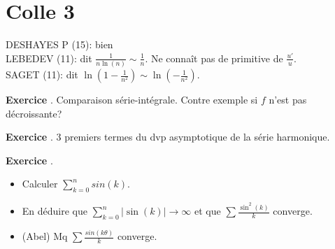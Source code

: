 \documentclass[10pt,a4paper]{article}
\newcounter{question}
\newcounter{exo}
\newenvironment{exo}{\vspace{0.5cm}\setcounter{question}{0}\addtocounter{exo}{1} \noindent \textbf{Exercice \theexo}. \normalsize }{\par}
\begin{document}
	\section*{Colle 3}
	\setcounter{exo}{0}
	DESHAYES P (15): bien\\
	LEBEDEV (11): dit $\frac{1}{n\ln(n)} \sim \frac{1}{n}$. Ne connaît pas de primitive de $\frac{u'}{u}$.\\
	SAGET (11): dit $\ln(1 - \frac{1}{n^2}) \sim \ln(- \frac{1}{n^2})$.\\
	
	\begin{exo}
		Comparaison série-intégrale. Contre exemple si $f$ n'est pas décroissante?
	\end{exo}
	
	\begin{exo}
		3 premiers termes du dvp asymptotique de la série harmonique.
	\end{exo}

	\begin{exo}
		\begin{itemize}
			\item Calculer $\sum_{k=0}^{n} sin(k)$.
			\item En déduire que $\sum_{k=0}^{n} \vert \sin(k) \vert \rightarrow \infty$ et que $\sum \frac{\sin^2(k)}{k}$ converge.
			\item (Abel) Mq $\sum \frac{sin(k \theta)}{k}$ converge.
		\end{itemize}			
	\end{exo}
\end{document}
